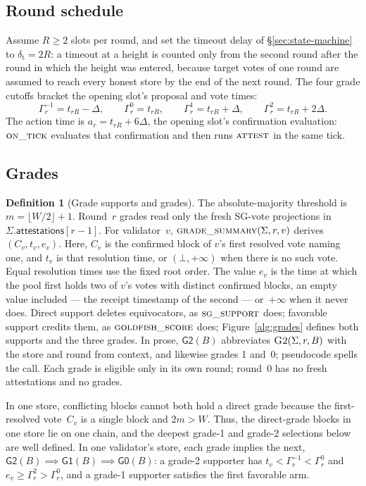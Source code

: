 \documentclass{article}
\theoremstyle{plain}
\theoremstyle{definition}
\newtheorem{definition}{Definition}
\theoremstyle{remark}
\newcommand{\attestations}{\mathsf{attestations}}
\newcommand{\fname}[1]{\text{\textsc{#1}}}
\newcommand{\Gtwo}{\mathsf{G2}}
\newcommand{\Gone}{\mathsf{G1}}
\newcommand{\Gzero}{\mathsf{G0}}
\begin{document}
\subsection{Round schedule}\label{sec:healing-schedule}

Assume $R\geq2$ slots per round, and set the timeout delay of \S\ref{sec:state-machine} to $\delta_{\mathrm{t}}=2R$: a timeout at a height is counted only from the second round after the round in which the height was entered, because target votes of one round are assumed to reach every honest store by the end of the next round.  The four grade cutoffs bracket the
opening slot's proposal and vote times:
\[
 \Gamma_r^{-1}=t_{rR}-\Delta,\qquad
 \Gamma_r^0=t_{rR},\qquad
 \Gamma_r^1=t_{rR}+\Delta,\qquad
 \Gamma_r^2=t_{rR}+2\Delta.
\]
The action time is $a_r=t_{rR}+6\Delta$, the opening slot's confirmation
evaluation: $\Call{on\_tick}{}$ evaluates that confirmation and then runs
$\Call{attest}{}$ in the same tick.

\subsection{Grades}\label{sec:grades}

\begin{definition}[Grade supports and grades]\label{def:grades}
The absolute-majority threshold is $m=\lfloor W/2\rfloor+1$.  Round~$r$
grades read only the fresh SG-vote projections in
$\Sigma.\attestations[r-1]$.  For validator~$v$,
$\Call{grade\_summary}{\Sigma,r,v}$ derives $(C_v,t_v,e_v)$.  Here, $C_v$
is the confirmed block of $v$'s first resolved vote naming one, and $t_v$
is that resolution time, or $(\bot,+\infty)$ when there is no such vote.
Equal resolution times use the fixed root order.  The value $e_v$ is the
time at which the pool first holds two of $v$'s votes with distinct
confirmed blocks, an empty value included --- the receipt timestamp of the
second --- or~$+\infty$ when it never does.
Direct support deletes equivocators, as $\fname{sg\_support}$ does;
favorable support credits them, as $\fname{goldfish\_score}$ does;
Figure~\ref{alg:grades} defines both supports and the three grades.
In prose, $\Gtwo(B)$ abbreviates
$\Call{G2}{\Sigma,r,B}$ with the store and round from context, and
likewise grades 1 and~0; pseudocode spells the call.
Each grade is eligible only in its own round; round~$0$ has no fresh
attestations and no grades.
\end{definition}

In one store, conflicting blocks cannot both hold a direct grade because
the first-resolved vote~$C_v$ is a single block and $2m>W$.
Thus, the direct-grade blocks in one store lie on one chain, and the
deepest grade-1 and grade-2 selections below are well defined.  In one
validator's store, each grade implies the next,
\mbox{$\Gtwo(B)\implies\Gone(B)\implies\Gzero(B)$}: a grade-2 supporter has
$t_v<\Gamma_r^{-1}<\Gamma_r^0$ and $e_v\geq\Gamma_r^2>\Gamma_r^0$, and a
grade-1 supporter satisfies the first favorable arm.
\end{document}
